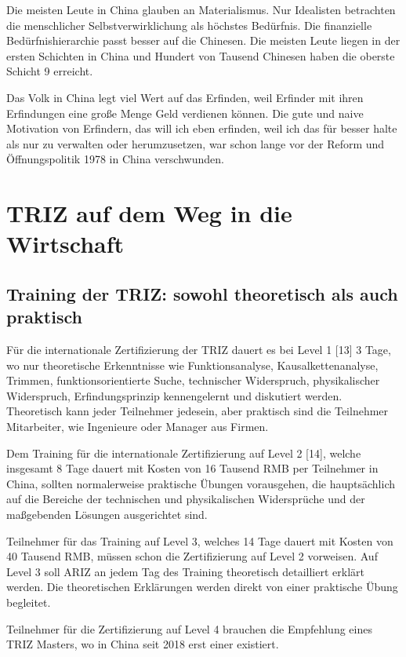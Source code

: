 \documentclass[11pt,a4paper]{article}
\begin{document}
Die meisten Leute in China glauben an Materialismus. Nur Idealisten betrachten
die menschlicher Selbstverwirklichung als höchstes Bedürfnis. Die finanzielle
Bedürfnishierarchie passt besser auf die Chinesen. Die meisten Leute liegen in
der ersten Schichten in China und Hundert von Tausend Chinesen haben die
oberste Schicht 9 erreicht.

Das Volk in China legt viel Wert auf das Erfinden, weil Erfinder mit ihren
Erfindungen eine große Menge Geld verdienen können. Die gute und naive
Motivation von Erfindern, das will ich eben erfinden, weil ich das für besser
halte als nur zu verwalten oder herumzusetzen, war schon lange vor der Reform
und Öffnungspolitik 1978 in China verschwunden.

\section{TRIZ auf dem Weg in die Wirtschaft}

\subsection{Training der TRIZ: sowohl theoretisch als auch praktisch}

Für die internationale Zertifizierung der TRIZ dauert es bei Level 1 [13] 3
Tage, wo nur theoretische Erkenntnisse wie Funktionsanalyse,
Kausalkettenanalyse, Trimmen, funktionsorientierte Suche, technischer
Widerspruch, physikalischer Widerspruch, Erfindungsprinzip kennengelernt und
diskutiert werden. Theoretisch kann jeder Teilnehmer jedesein, aber praktisch
sind die Teilnehmer Mitarbeiter, wie Ingenieure oder Manager aus Firmen.

Dem Training für die internationale Zertifizierung auf Level 2 [14], welche
insgesamt 8 Tage dauert mit Kosten von 16 Tausend RMB per Teilnehmer in China,
sollten normalerweise praktische Übungen vorausgehen, die hauptsächlich auf
die Bereiche der technischen und physikalischen Widersprüche und der
maßgebenden Lösungen ausgerichtet sind.

Teilnehmer für das Training auf Level 3, welches 14 Tage dauert mit Kosten von
40 Tausend RMB, müssen schon die Zertifizierung auf Level 2 vorweisen. Auf
Level 3 soll ARIZ an jedem Tag des Training theoretisch detailliert erklärt
werden. Die theoretischen Erklärungen werden direkt von einer praktische Übung
begleitet.

Teilnehmer für die Zertifizierung auf Level 4 brauchen die Empfehlung eines
TRIZ Masters, wo in China seit 2018 erst einer existiert.
\end{document}

